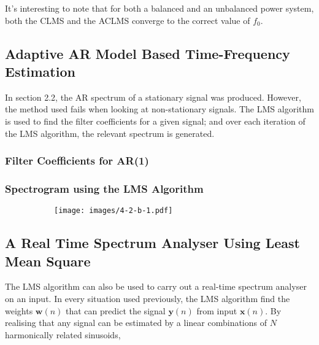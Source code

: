 \documentclass[main.tex]{subfiles}
\begin{document}
It's interesting to note that for both a balanced and an unbalanced power system, both the CLMS and the ACLMS converge to the correct value of $f_0$.


\subsection{Adaptive AR Model Based Time-Frequency Estimation}

In section 2.2, the AR spectrum of a stationary signal was produced. However, the method used fails when looking at non-stationary signals. The LMS algorithm is used to find the filter coefficients for a given signal; and over each iteration of the LMS algorithm, the relevant spectrum is generated. 

\subsubsection{Filter Coefficients for AR(1)}


\begin{figure}[H]
	\centering 
	\resizebox{0.9\textwidth}{!}{}
	\caption{}
	\label{fig:q4_2_a}
\end{figure}


\subsubsection{Spectrogram using the LMS Algorithm}


\begin{figure}[H]
	\centering
	\begin{subfigure}[b]{0.9\textwidth}
		\texttt{[image: images/4-2-b-1.pdf]}
		\caption{}
	\end{subfigure}%
	
	\begin{subfigure}[b]{0.9\textwidth}
		\resizebox{\textwidth}{!}{}
		\caption{}
	\end{subfigure}
	\caption{}
	\label{}
\end{figure}






\subsection{A Real Time Spectrum Analyser Using Least Mean Square}

The LMS algorithm can also be used to carry out a real-time spectrum analyser on an input. In every situation used previously, the LMS algorithm find the weights $\textbf{w}(n)$ that can predict the signal $\textbf{y}(n)$ from input $\textbf{x}(n)$. By realising that any signal can be estimated by a linear combinations of $N$ harmonically related sinusoids,
\end{document}
